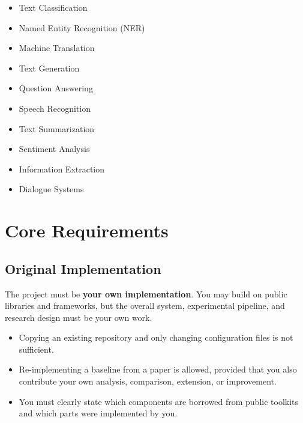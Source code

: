 \documentclass{article}
\begin{document}
\begin{itemize}
  \item Text Classification
  \item Named Entity Recognition (NER)
  \item Machine Translation
  \item Text Generation
  \item Question Answering 
  \item Speech Recognition
  \item Text Summarization
  \item Sentiment Analysis
  \item Information Extraction
  \item Dialogue Systems
\end{itemize}

\section{Core Requirements}

\subsection{Original Implementation}

The project must be \textbf{your own implementation}.
You may build on public libraries and frameworks,
but the overall system, experimental pipeline, and research design must be your own work.

\begin{itemize}
  \item Copying an existing repository and only changing configuration files is not sufficient.
  \item Re-implementing a baseline from a paper is allowed, provided that you also contribute
  your own analysis, comparison, extension, or improvement.
  \item You must clearly state which components are borrowed from public toolkits
  and which parts were implemented by you.
\end{itemize}
\end{document}
